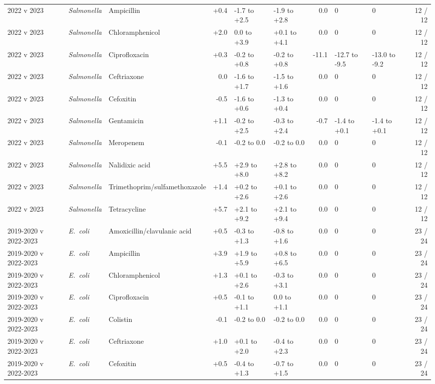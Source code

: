 {\begin{longtable}{lllrllrllr}
2022 v 2023 & \textit{Salmonella} & Ampicillin & +0.4 & -1.7 to +2.5 & -1.9 to +2.8 & 0.0 & 0 & 0 & 12 / 12 \\
2022 v 2023 & \textit{Salmonella} & Chloramphenicol & +2.0 & 0.0 to +3.9 & +0.1 to +4.1 & 0.0 & 0 & 0 & 12 / 12 \\
2022 v 2023 & \textit{Salmonella} & Ciprofloxacin & +0.3 & -0.2 to +0.8 & -0.2 to +0.8 & -11.1 & -12.7 to -9.5 & -13.0 to -9.2 & 12 / 12 \\
2022 v 2023 & \textit{Salmonella} & Ceftriaxone & 0.0 & -1.6 to +1.7 & -1.5 to +1.6 & 0.0 & 0 & 0 & 12 / 12 \\
2022 v 2023 & \textit{Salmonella} & Cefoxitin & -0.5 & -1.6 to +0.6 & -1.3 to +0.4 & 0.0 & 0 & 0 & 12 / 12 \\
2022 v 2023 & \textit{Salmonella} & Gentamicin & +1.1 & -0.2 to +2.5 & -0.3 to +2.4 & -0.7 & -1.4 to +0.1 & -1.4 to +0.1 & 12 / 12 \\
2022 v 2023 & \textit{Salmonella} & Meropenem & -0.1 & -0.2 to 0.0 & -0.2 to 0.0 & 0.0 & 0 & 0 & 12 / 12 \\
2022 v 2023 & \textit{Salmonella} & Nalidixic acid & +5.5 & +2.9 to +8.0 & +2.8 to +8.2 & 0.0 & 0 & 0 & 12 / 12 \\
2022 v 2023 & \textit{Salmonella} & Trimethoprim/sulfamethoxazole & +1.4 & +0.2 to +2.6 & +0.1 to +2.6 & 0.0 & 0 & 0 & 12 / 12 \\
2022 v 2023 & \textit{Salmonella} & Tetracycline & +5.7 & +2.1 to +9.2 & +2.1 to +9.4 & 0.0 & 0 & 0 & 12 / 12 \\
2019-2020 v 2022-2023 & \textit{E.~coli} & Amoxicillin/clavulanic acid & +0.5 & -0.3 to +1.3 & -0.8 to +1.6 & 0.0 & 0 & 0 & 23 / 24 \\
2019-2020 v 2022-2023 & \textit{E.~coli} & Ampicillin & +3.9 & +1.9 to +5.9 & +0.8 to +6.5 & 0.0 & 0 & 0 & 23 / 24 \\
2019-2020 v 2022-2023 & \textit{E.~coli} & Chloramphenicol & +1.3 & +0.1 to +2.6 & -0.3 to +3.1 & 0.0 & 0 & 0 & 23 / 24 \\
2019-2020 v 2022-2023 & \textit{E.~coli} & Ciprofloxacin & +0.5 & -0.1 to +1.1 & 0.0 to +1.1 & 0.0 & 0 & 0 & 23 / 24 \\
2019-2020 v 2022-2023 & \textit{E.~coli} & Colistin & -0.1 & -0.2 to 0.0 & -0.2 to 0.0 & 0.0 & 0 & 0 & 23 / 24 \\
2019-2020 v 2022-2023 & \textit{E.~coli} & Ceftriaxone & +1.0 & +0.1 to +2.0 & -0.4 to +2.3 & 0.0 & 0 & 0 & 23 / 24 \\
2019-2020 v 2022-2023 & \textit{E.~coli} & Cefoxitin & +0.5 & -0.4 to +1.3 & -0.7 to +1.5 & 0.0 & 0 & 0 & 23 / 24 \\

\end{longtable}}
